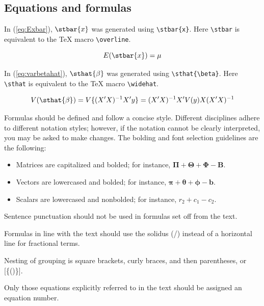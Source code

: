 \subsection{Equations and formulas}

In (\ref{eq:Exbar}), $\stbar{x}$ was generated using
\verb+\stbar{x}+.  Here \verb+\stbar+ is equivalent to the \TeX{} macro
\verb+\overline+.

\begin{equation}
E(\stbar{x}) = \mu
\label{eq:Exbar}
\end{equation}

In (\ref{eq:varbetahat}), $\sthat{\beta}$ was generated using
\verb+\sthat{\beta}+.  Here \verb+\sthat+ is equivalent to the \TeX{} macro
\verb+\widehat+.

\begin{equation}
V(\sthat{\beta}) = V\{(X'X)^{-1}X'y\} = (X'X)^{-1}X'V(y)X(X'X)^{-1}
\label{eq:varbetahat}
\end{equation}

\clearpage

Formulas should be defined and follow a concise style. Different
disciplines adhere to different notation styles; however, if the
notation cannot be clearly interpreted, you may be asked to make
changes. The bolding and font selection guidelines are the following:

\begin{itemize}
\item
	Matrices are capitalized and bolded; for instance, $\boldsymbol\Pi +
	\boldsymbol\Theta + \boldsymbol\Phi - \mathbf{B}$.

\item
	Vectors are lowercased and bolded; for instance, $\boldsymbol\pi +
	\boldsymbol\theta + \boldsymbol\phi - \mathbf{b}$.

\item
        Scalars are lowercased and nonbolded; for instance, $r_2 + c_1 - c_2$.
\end{itemize}


Sentence punctuation should not be used in formulas set off from the text.

Formulas in line with the text should use the solidus (/) instead of a
horizontal line for fractional terms.

Nesting of grouping is square brackets, curly braces, and then parentheses, or
[\{()\}].

Only those equations explicitly referred to in the text should be assigned an
equation number.

